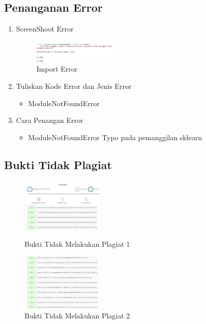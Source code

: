 \subsection{Penanganan Error}
\begin{enumerate}
\item ScreenShoot Error
\begin{figure}[H]
	\includegraphics[width=4cm]{figures/1174051/1/error/1.JPG}
	\centering
	\caption{Import Error}
\end{figure}
\item Tuliskan Kode Error dan Jenis Error
\begin{itemize}
	\item ModuleNotFoundError
\end{itemize}
\item Cara Penangan Error
\begin{itemize}
	\item ModuleNotFoundError
	\hfill\break
	Typo pada pemanggilan sklearn
\end{itemize}
\end{enumerate}
\subsection{Bukti Tidak Plagiat}
\begin{figure}[H]
\includegraphics[width=4cm]{figures/1174051/1/plagiat/1.JPG}
\centering
\caption{Bukti Tidak Melakukan Plagiat 1}
\includegraphics[width=4cm]{figures/1174051/1/plagiat/2.JPG}
\centering
\caption{Bukti Tidak Melakukan Plagiat 2}
\end{figure}